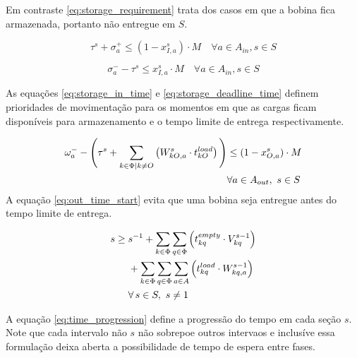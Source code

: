 \documentclass[journal]{IEEEtran}
\begin{document}
        Em contraste \ref{eq:storage_requirement} trata dos casos em que a bobina fica armazenada, portanto não
        entregue em $S$.
        
        

        \begin{equation}
        \tau^s + \sigma^+_a \leq (1 - x^s_{I,a}) \cdot M \quad \forall a \in A_{in}, s \in S 
            \label{eq:storage_in_time}
        \end{equation}
        
        \begin{equation}
             \sigma^-_a - \tau^s \leq x^s_{I,a} \cdot M \quad \forall a \in A_{in}, s \in S 
            \label{eq:storage_deadline_time}
        \end{equation}
        
        As equações \ref{eq:storage_in_time} e \ref{eq:storage_deadline_time} definem
        prioridades de movimentação para os momentos em que as cargas ficam disponíveis
        para armazenamento e o tempo limite de entrega respectivamente.

        \begin{align}
            \omega_a^- - \Bigg( \tau^s + 
            \sum_{k \in \Phi \mid k \neq O} \left( W^s_{kO,a} \cdot t^{load}_{kO} \right) 
            \Bigg) 
            &\leq (1 - x^s_{O,a}) \cdot M \notag \\
            &\forall a \in A_{out},\ s \in S 
            \label{eq:out_time_start}
        \end{align}
        A equação \ref{eq:out_time_start} evita que uma bobina seja entregue antes
        do tempo limite de entrega.

        \begin{align}
            s \geq\; & s^{-1} 
            + \sum_{k \in \Phi} \sum_{q \in \Phi} \left( t^{empty}_{kq} \cdot V^{s-1}_{kq} \right) \notag \\
            & + \sum_{k \in \Phi} \sum_{q \in \Phi} \sum_{a \in A} \left( t^{load}_{kq} \cdot W^{s-1}_{kq,a} \right) \notag \\
            & \forall\, s \in S,\ s \neq 1 \label{eq:time_progression}
        \end{align}

        A equação \ref{eq:time_progression} define a progressão do tempo em cada
         seção $s$.
        Note que cada intervalo não $s$ não sobrepoe outros intervaos e inclusíve
        essa formulação deixa aberta a possibilidade de tempo de espera entre fases.
        
\end{document}

